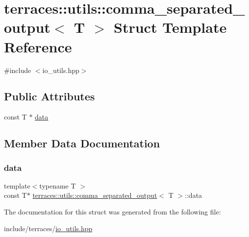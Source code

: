 \hypertarget{structterraces_1_1utils_1_1comma__separated__output}{}\section{terraces\+:\+:utils\+:\+:comma\+\_\+separated\+\_\+output$<$ T $>$ Struct Template Reference}
\label{structterraces_1_1utils_1_1comma__separated__output}


{\ttfamily \#include $<$io\+\_\+utils.\+hpp$>$}

\subsection*{Public Attributes}
\begin{DoxyCompactItemize}
\item 
const T $\ast$ \hyperlink{structterraces_1_1utils_1_1comma__separated__output_add0bccac2b85384638ff01e49beb8018}{data}
\end{DoxyCompactItemize}


\subsection{Member Data Documentation}
\mbox{\label{structterraces_1_1utils_1_1comma__separated__output_add0bccac2b85384638ff01e49beb8018}} 
\subsubsection{\texorpdfstring{data}{data}}
{\footnotesize\ttfamily template$<$typename T $>$ \\
const T$\ast$ \hyperlink{structterraces_1_1utils_1_1comma__separated__output}{terraces\+::utils\+::comma\+\_\+separated\+\_\+output}$<$ T $>$\+::data}



The documentation for this struct was generated from the following file\+:\begin{DoxyCompactItemize}
\item 
include/terraces/\hyperlink{io__utils_8hpp}{io\+\_\+utils.\+hpp}\end{DoxyCompactItemize}
